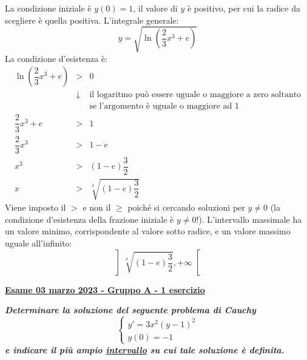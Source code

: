 \documentclass[a4paper]{article}
\newcommand{\definition}[1]{\textcolor{Red3}{\textbf{#1}}}
\newcommand{\example}[1]{\textcolor{Green4}{\textbf{#1}}}
\begin{document}
	La condizione iniziale è $y\left(0\right) = 1$, il valore di $y$ è positivo, per cui la radice da scegliere è quella positiva. L'integrale generale:
	\begin{equation*}
		y = \sqrt{\ln\left(\dfrac{2}{3}x^{3} + e\right)}
	\end{equation*}
	La condizione d'esistenza è:
	\begin{equation*}
		\begin{array}{rcl}
			\ln\left(\dfrac{2}{3}x^{3} + e\right) &>& 0 \\
			&\downarrow& \text{il logaritmo può essere uguale o maggiore a zero soltanto} \\
			&& \text{se l'argomento è uguale o maggiore ad }1 \\
			\dfrac{2}{3}x^{3} + e &>& 1 \\
			\dfrac{2}{3}x^{3} &>& 1 - e \\
			x^{3} &>& \left(1 - e\right)\dfrac{3}{2} \\ [.5em]
			x &>& \sqrt[3]{\left(1 - e\right)\dfrac{3}{2}}
		\end{array}
	\end{equation*}
	Viene imposto il $>$ e non il $\ge$ poiché si cercando soluzioni per $y \ne 0$ (la condizione d'esistenza della frazione iniziale è $y \ne 0$!). L'intervallo massimale ha un valore minimo, corrispondente al valore sotto radice, e un valore massimo uguale all'infinito:
	\begin{equation*}
		\left] \sqrt[3]{\left(1 - e\right)\dfrac{3}{2}}, +\infty \right[
	\end{equation*}\newpage

	\begin{flushleft}
		\label{exam: esame 03 marzo 2023 - Gruppo A - 1 esercizio}
		\hypertarget{
			exam: esame 03 marzo 2023 - Gruppo A - 1 esercizio
		}{
			\definition{\underline{Esame 03 marzo 2023 - Gruppo A - 1 esercizio}}
		}
	\end{flushleft}
	\example{\emph{Determinare la soluzione del seguente problema di Cauchy}
	\begin{equation*}
		\begin{cases}
			y' = 3x^{2}\left(y-1\right)^{2} \\
			y\left(0\right) = -1
		\end{cases}
	\end{equation*}
	\emph{e indicare il più ampio \underline{intervallo} su cui tale soluzione è definita.}}\newline
\end{document}
